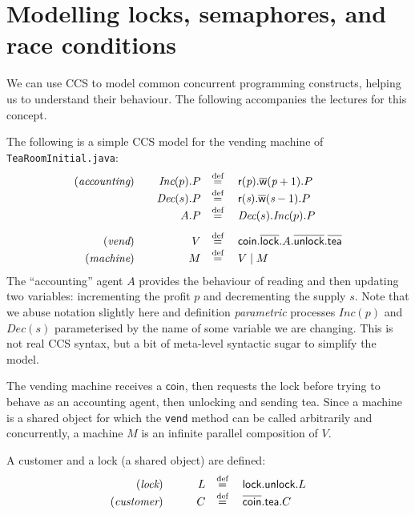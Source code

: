 \documentclass{article}
\def\mystrut{\rule{0pt}{0.68em}}
\newcommand{\act}[1]{\textsf{#1}}
\newcommand{\da}[1]{\overline{\mystrut\textsf{#1}}}
\newcommand{\defn}{\stackrel{\text{def}}{=}}
\newcommand{\dak}[1]{\overline{\textsf{#1}}}
\newcommand{\op}[2]{\act{r}(#1).\dak{w}(#1 #2)}
\theoremstyle{definition}
\begin{document}
\section{Modelling locks, semaphores, and race conditions}

We can use CCS to model common concurrent programming constructs,
helping us to understand their behaviour. The following accompanies
the lectures for this concept.

The following is a simple CCS model for the
vending machine of \texttt{TeaRoomInitial.java}:
%
\setlength{\arraycolsep}{0.2em}
\begin{align*}
\begin{array}{rrcl}
(\textit{accounting})\quad &
\textit{Inc}(p).P & \defn{} & \op{\textit{p}}{+1}.P \\
& \textit{Dec}(s).P & \defn{} & \op{\textit{s}}{-1}.P \\
& A.P & \defn{} & \textit{Dec}(s).\textit{Inc}(p).P \\[0.75em]
(\textit{vend})\quad & V & \defn{} & \act{coin}.\da{lock}.A.\da{unlock}.\da{tea} \\
(\textit{machine})\quad & M & \defn{} & V \mid M
\end{array}
\end{align*}
%
The ``{accounting}'' agent $A$ provides the behaviour of reading and
then updating two variables: incrementing the profit $p$ and
decrementing the supply $s$. Note that we abuse notation slightly here
and definition \emph{parametric} processes $\mathit{Inc}(p)$ and
$\mathit{Dec}(s)$ parameterised by the name of some variable we are
changing.  This is not real CCS syntax, but a bit of meta-level
syntactic sugar to simplify the model.

The vending
machine receives a $\act{coin}$, then requests the lock before trying to behave as an accounting
agent, then unlocking and sending tea.
Since a machine is a shared object for which the
\texttt{vend} method can be called arbitrarily and concurrently,
a machine $M$ is an infinite parallel composition of $V$.



A customer and a lock (a shared object) are defined:
%
\setlength{\arraycolsep}{0.2em}
\begin{align*}
\begin{array}{rrcl}
(\textit{lock})\qquad & L & \defn{} & \act{lock}.\act{unlock}.L \\
(\textit{customer})\qquad & C & \defn{} & \da{coin}.\act{tea}.C
\end{array}
\end{align*}
\end{document}
